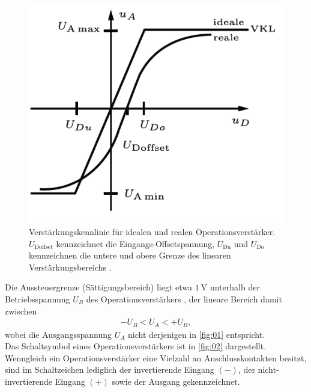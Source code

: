 \begin{figure}
  \centering
  \includegraphics[scale=0.5]{ressources/figure_01.png}
  \caption{Verstärkungskennlinie für idealen und realen Operationsverstärker. $U_\text{Doffset}$
  kennzeichnet die Eingangs-Offsetspannung, $U_\text{Du}$ und $U_\text{Do}$ kennzeichnen
  die untere und obere Grenze des linearen Verstärkungsbereichs \cite{elektrotechnik}.}
  \label{fig:01}
\end{figure}
\noindent Die Aussteuergrenze (Sättigungsbereich) liegt etwa $\SI{1}{\volt}$
unterhalb der Betriebsspannung $U_B$ des Operationsverstärkers \cite{federau}, der
lineare Bereich damit zwischen
\begin{align}
  - U_B < U_A < + U_B,
  \label{eqn:02}
\end{align}
\noindent wobei die Ausgangsspannung $U_A$ nicht derjenigen in \autoref{fig:01}
entspricht. \\
\newline
\noindent Das Schaltsymbol eines Operationsverstärkers ist in \autoref{fig:02}
dargestellt. Wenngleich ein Operationsverstärker eine Vielzahl an
Anschlusskontakten besitzt, sind im Schaltzeichen lediglich der
invertierende Eingang $(-)$, der nicht-invertierende Eingang $(+)$ sowie der
Ausgang gekennzeichnet.
